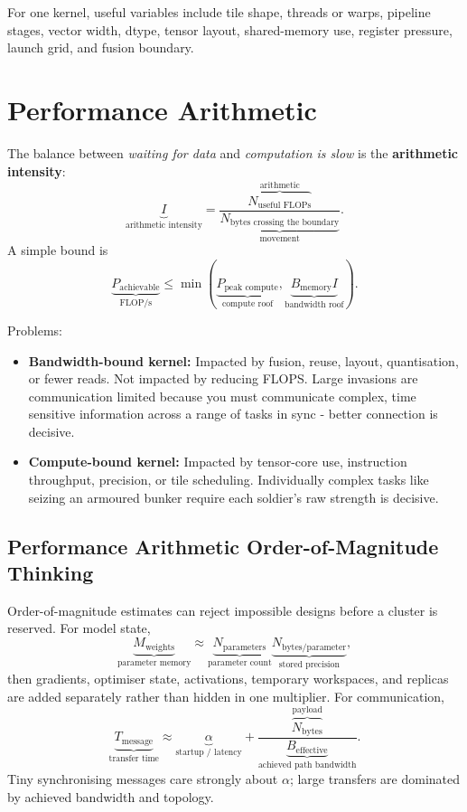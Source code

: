 \begin{calloutdegreeexperiment}
    For one kernel, useful variables include tile shape, threads or warps, pipeline stages, vector width, dtype, tensor layout, shared-memory use, register pressure, launch grid, and fusion boundary.
\end{calloutdegreeexperiment}

\section{Performance Arithmetic}
\label{sec:hardware-roofline}
The balance between \textit{waiting for data} and \textit{computation is slow} is the \textbf{arithmetic intensity}:
\[
    \underbrace{I}_{\text{arithmetic intensity}}
    =
    \frac{\overbrace{N_{\text{useful FLOPs}}}^{\text{arithmetic}}}
    {\underbrace{N_{\text{bytes crossing the boundary}}}_{\text{movement}}}.
\]
A simple bound is
\[
    \underbrace{P_{\text{achievable}}}_{\text{FLOP/s}}
    \leq
    \min\!\left(
    \underbrace{P_{\text{peak compute}}}_{\text{compute roof}},
    \underbrace{B_{\text{memory}}I}_{\text{bandwidth roof}}
    \right).
\]

Problems:
\begin{itemize}
    \item \textbf{Bandwidth-bound kernel:} Impacted by fusion, reuse, layout, quantisation, or fewer reads. 
    Not impacted by reducing FLOPS.
    Large invasions are communication limited because you must communicate complex, time sensitive information across a range of tasks in sync - better connection is decisive.
    \item \textbf{Compute-bound kernel: } Impacted by tensor-core use, instruction throughput, precision, or tile scheduling. 
    Individually complex tasks like seizing an armoured bunker require each soldier's raw strength is decisive.
\end{itemize}

\subsection{Performance Arithmetic Order-of-Magnitude Thinking}
Order-of-magnitude estimates can reject impossible designs before a cluster is reserved.
For model state,
\[
\underbrace{M_{\text{weights}}}_{\text{parameter memory}}
\approx
\underbrace{N_{\text{parameters}}}_{\text{parameter count}}
\underbrace{N_{\text{bytes/parameter}}}_{\text{stored precision}},
\]
then gradients, optimiser state, activations, temporary workspaces, and replicas are added separately rather than hidden in one multiplier.
For communication,
\[
\underbrace{T_{\text{message}}}_{\text{transfer time}}
\approx
\underbrace{\alpha}_{\text{startup / latency}}
+
\frac{\overbrace{N_{\text{bytes}}}^{\text{payload}}}
{\underbrace{B_{\text{effective}}}_{\text{achieved path bandwidth}}}.
\]
Tiny synchronising messages care strongly about $\alpha$; large transfers are dominated by achieved bandwidth and topology.

